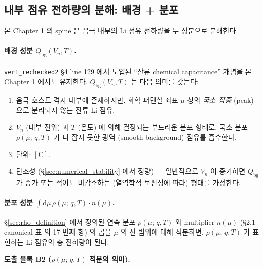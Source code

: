 \documentclass[11pt,a4paper]{article}
\newcommand{\dd}{\mathrm{d}}
\newcommand{\bg}{\mathrm{bg}}
\newcommand{\Cunit}{\mathrm{C}}
\newcommand{\mucont}{\mu}
\newcommand{\rhomu}{\rho(\mucont;\, q, T)}
\newcommand{\nmu}{n(\mucont)}
\begin{document}
\subsection{내부 점유 전하량의 분해: 배경 + 분포}
\label{sec:internal_decomposition}

본 Chapter 1 의 spine 은 음극 내부의 Li 점유 전하량을 두 성분으로 분해한다.

\paragraph{배경 성분 $Q_{\bg}(V_n, T)$.}

\texttt{ver1\_rechecked2} \S 4 line 129 에서 도입된 ``잔류 chemical capacitance''
개념을 본 Chapter 1 에서도 유지한다. $Q_{\bg}(V_n, T)$ 는 다음 의미를 갖는다:

\begin{enumerate}[label=(\alph*)]
\item 음극 호스트 격자 내부에 존재하지만, 화학 퍼텐셜 좌표 $\mucont$ 상의
      \emph{국소 집중} (peak) 으로 분리되지 않는 잔류 Li 점유.
\item $V_n$ (내부 전위) 과 $T$ (온도) 에 의해 결정되는 부드러운 분포 형태로,
      국소 분포 $\rhomu$ 가 다 잡지 못한 광역 (smooth background) 점유를 흡수한다.
\item 단위: $[\Cunit]$.
\item 단조성 (\S\ref{sec:numerical_stability} 에서 정량) — 일반적으로 $V_n$ 이
      증가하면 $Q_{\bg}$ 가 증가 또는 적어도 비감소하는 (열역학적 보편성에 따라)
      형태를 가정한다.
\end{enumerate}

\paragraph{분포 성분 $\int \dd\mucont\, \rhomu \cdot \nmu$.}

\S\ref{sec:rho_definition} 에서 정의된 연속 분포 $\rhomu$ 와 multiplier $\nmu$
(\S 2.1 canonical 표 의 17 번째 항) 의 곱을 $\mucont$ 의 전 범위에 대해 적분하면,
$\rhomu$ 가 표현하는 Li 점유의 총 전하량이 된다.

\textbf{도출 블록 B2 ($\rhomu$ 적분의 의미).}
\end{document}
